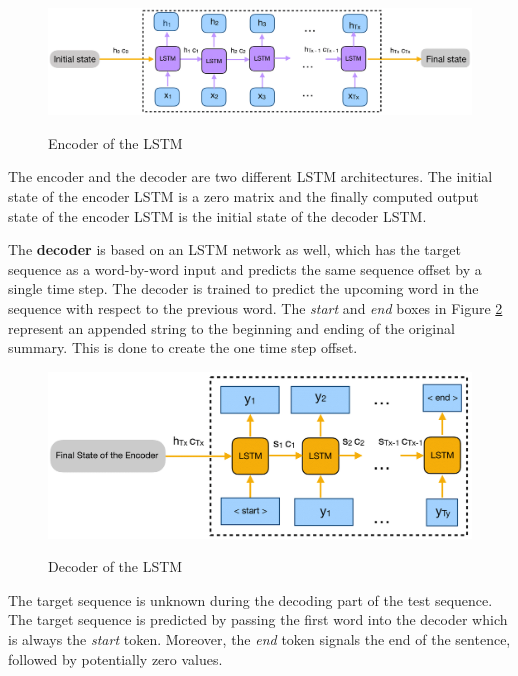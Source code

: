 \begin{figure}
	\begin{center}
		\includegraphics[width=6in]{photos/trainenc-1}\\
		\caption{Encoder of the LSTM}\label{trainenc}
	\end{center}
\end{figure}

The encoder and the decoder are two different LSTM architectures. The initial state of the encoder LSTM is a zero matrix and the finally computed output state of the encoder LSTM is the initial state of the decoder LSTM.

The \textbf{ decoder} is based on an LSTM network as well, which has the target sequence as a word-by-word input and predicts the same sequence offset by a single time step. The decoder is trained to predict the upcoming word in the sequence with respect to the previous word. The \textit{start} and \textit{end} boxes in Figure \ref{traindec} represent an appended string to the beginning and ending of the original summary. This is done to create the one time step offset.

\begin{figure}
	\begin{center}
		\includegraphics[width=6in]{photos/traindec-1}\\
		\caption{Decoder of the LSTM}\label{traindec}
	\end{center}
\end{figure}

The target sequence is unknown during the decoding part of the test sequence. The target sequence is predicted by passing the first word into the decoder which is always the \textit{start} token. Moreover, the \textit{end} token signals the end of the sentence, followed by potentially zero values.


